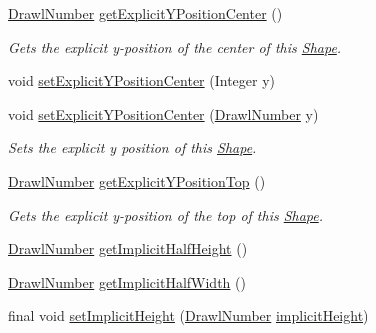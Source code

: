 \begin{DoxyCompactItemize}
\hyperlink{classcom_1_1aarrelaakso_1_1drawl_1_1_drawl_number}{Drawl\+Number} \hyperlink{classcom_1_1aarrelaakso_1_1drawl_1_1_shape_a602cb73f783f2856fa81e82bf7792263}{get\+Explicit\+Y\+Position\+Center} ()
\begin{DoxyCompactList}\small\item\em Gets the explicit y-\/position of the center of this \hyperlink{classcom_1_1aarrelaakso_1_1drawl_1_1_shape}{Shape}. \end{DoxyCompactList}\item 
void \hyperlink{classcom_1_1aarrelaakso_1_1drawl_1_1_shape_a947c00be2ea3d0e732814b8ca377df45}{set\+Explicit\+Y\+Position\+Center} (Integer y)
\item 
void \hyperlink{classcom_1_1aarrelaakso_1_1drawl_1_1_shape_a169bdd3220baa80ebb083b3b2db12546}{set\+Explicit\+Y\+Position\+Center} (\hyperlink{classcom_1_1aarrelaakso_1_1drawl_1_1_drawl_number}{Drawl\+Number} y)
\begin{DoxyCompactList}\small\item\em Sets the explicit y position of this \hyperlink{classcom_1_1aarrelaakso_1_1drawl_1_1_shape}{Shape}. \end{DoxyCompactList}\item 
\hyperlink{classcom_1_1aarrelaakso_1_1drawl_1_1_drawl_number}{Drawl\+Number} \hyperlink{classcom_1_1aarrelaakso_1_1drawl_1_1_shape_a95f8a2f107299d91813627a95b3e0f0f}{get\+Explicit\+Y\+Position\+Top} ()
\begin{DoxyCompactList}\small\item\em Gets the explicit y-\/position of the top of this \hyperlink{classcom_1_1aarrelaakso_1_1drawl_1_1_shape}{Shape}. \end{DoxyCompactList}\item 
\hyperlink{classcom_1_1aarrelaakso_1_1drawl_1_1_drawl_number}{Drawl\+Number} \hyperlink{classcom_1_1aarrelaakso_1_1drawl_1_1_shape_aa476150489a3a5b634a15a1c03e045d7}{get\+Implicit\+Half\+Height} ()
\item 
\hyperlink{classcom_1_1aarrelaakso_1_1drawl_1_1_drawl_number}{Drawl\+Number} \hyperlink{classcom_1_1aarrelaakso_1_1drawl_1_1_shape_ac796f934debb4cf92d285f387422deb6}{get\+Implicit\+Half\+Width} ()
\item 
final void \hyperlink{classcom_1_1aarrelaakso_1_1drawl_1_1_shape_acb96a96a1d43132def75a38c136c563f}{set\+Implicit\+Height} (\hyperlink{classcom_1_1aarrelaakso_1_1drawl_1_1_drawl_number}{Drawl\+Number} \hyperlink{classcom_1_1aarrelaakso_1_1drawl_1_1_shape_af2f5b1d81ce2cdabc8b18dfb029f413b}{implicit\+Height})

\end{DoxyCompactItemize}
